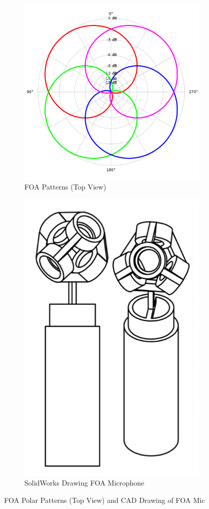 \begin{figure}
\centering
\begin{subfigure}{.5\textwidth}
  \centering
  \includegraphics[width=.6\linewidth]{img/foa-pattern.png}
  \caption{FOA Patterns (Top View) \cite{FileNaiv77online}}
  \label{fig:foa-patt}
\end{subfigure}%
\begin{subfigure}{.5\textwidth}
  \centering
  \includegraphics[width=.6\linewidth]{img/yigal-kamel.JPG}
  \caption{SolidWorks Drawing FOA Microphone}
  \label{fig:yigal-kamel}
\end{subfigure}
\caption{FOA Polar Patterns (Top View) and CAD Drawing of FOA Mic}
\label{fig:foa-patt-n-mic}
\end{figure}

